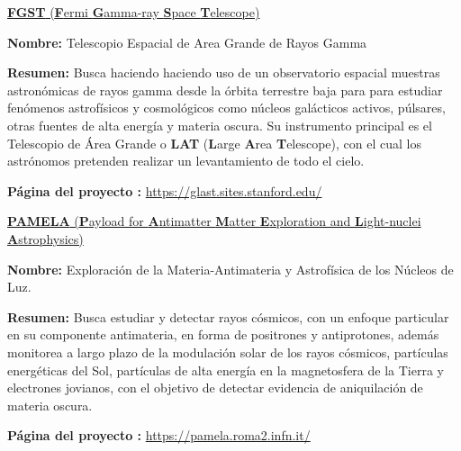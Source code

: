\href{https://en.wikipedia.org/wiki/Fermi_Gamma-ray_Space_Telescope}{\textbf{FGST} (\textbf{F}ermi \textbf{G}amma-ray \textbf{S}pace \textbf{T}elescope)}
\begin{itemize_f}\label{fermi}
\item \textbf{Nombre:} Telescopio Espacial de Area Grande de Rayos Gamma  
\item \textbf{Resumen:} Busca haciendo haciendo uso de un observatorio espacial muestras astronómicas de rayos gamma desde la órbita terrestre baja para para estudiar fenómenos astrofísicos y cosmológicos como núcleos galácticos activos, púlsares, otras fuentes de alta energía y materia oscura. Su instrumento principal es el Telescopio de Área Grande o \textbf{LAT} (\textbf{L}arge \textbf{A}rea \textbf{T}elescope), con el cual los astrónomos pretenden realizar un levantamiento de todo el cielo. %
\item \textbf{Página del proyecto :} \href{https://glast.sites.stanford.edu/}{https://glast.sites.stanford.edu/}
\end{itemize_f}

\href{https://en.wikipedia.org/wiki/PAMELA_detector}{\textbf{PAMELA} (\textbf{P}ayload for \textbf{A}ntimatter \textbf{M}atter \textbf{E}xploration and \textbf{L}ight-nuclei \textbf{A}strophysics)}
\begin{itemize_f}\label{pamela}
\item \textbf{Nombre:} Exploración de la Materia-Antimateria y Astrofísica de los Núcleos de Luz.
\item \textbf{Resumen:} Busca estudiar y detectar rayos cósmicos, con un enfoque particular en su componente antimateria, en forma de positrones y antiprotones, además monitorea a largo plazo de la modulación solar de los rayos cósmicos, partículas energéticas del Sol, partículas de alta energía en la magnetosfera de la Tierra y electrones jovianos, con el objetivo de detectar evidencia de aniquilación de materia oscura.
\item \textbf{Página del proyecto :} \href{https://pamela.roma2.infn.it/}{https://pamela.roma2.infn.it/}
\end{itemize_f}

